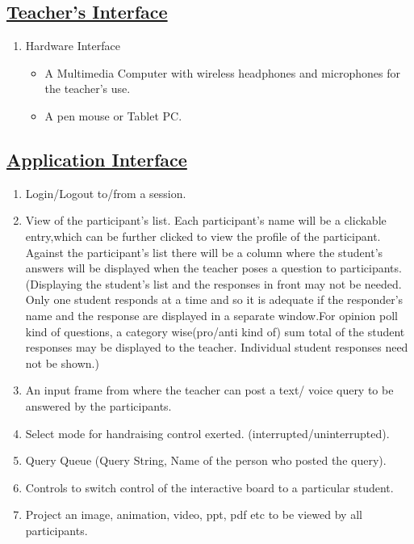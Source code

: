 \documentclass{article}
\begin{document}
\begin{enumerate}
\subsection*{\underline{Teacher's Interface}}
\begin{enumerate}
\item 
Hardware Interface
\begin{itemize}
\item A Multimedia Computer with wireless headphones and microphones for the teacher's use. 
\item A pen mouse or Tablet PC. 
\end{itemize}
\end{enumerate}
\subsection*{\underline{Application Interface}}
\begin{enumerate}
\item Login/Logout to/from a session. 

\item View of the participant's list. Each participant's name will be a clickable entry,which can be further clicked to view the profile of the participant. Against the participant's list there will be a column where the student's answers will be displayed when the teacher poses a question to participants. (Displaying the student's list and the responses in front may not be  needed. Only one student responds at a time and so it is adequate if the responder's name and the response are displayed in a separate window.For opinion poll kind of questions, a category wise(pro/anti kind of) sum total of the student responses may be displayed to the teacher. Individual student responses need not be shown.)
   
\item An input frame from where the teacher can post a text/ voice query to be answered by the participants. 

\item Select mode for handraising control exerted. (interrupted/uninterrupted). 

\item Query Queue (Query String, Name of the person who posted the query).

\item Controls to switch control of the interactive board to a particular student. 

\item Project an image, animation, video, ppt, pdf etc to be viewed by all participants. 


\end{enumerate}
\end{enumerate}
\end{document}
